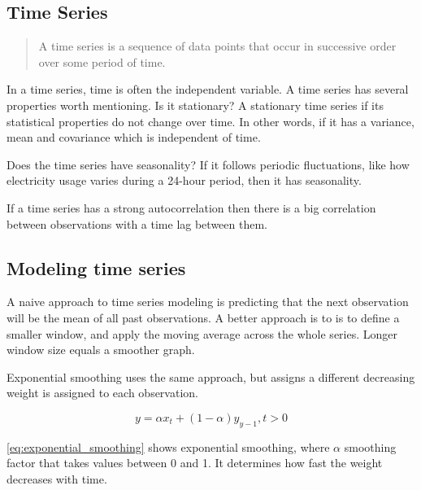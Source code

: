 \subsection{Time Series}
\label{sec:time-series}
\begin{quote}
    A time series is a sequence of data
    points that occur in successive order over some period of time.
\end{quote}
\cite{Hayes}

In a time series, time is often the independent variable.
A time series has several properties worth mentioning.
Is it stationary?
A stationary time series if its statistical properties do not change over time.
In other words, if it has a variance, mean and covariance which is independent of time.

Does the time series have seasonality?
If it follows periodic fluctuations, like how electricity usage varies during a 24-hour period,
then it has seasonality.

If a time series has a strong autocorrelation then there is a big
correlation between observations with a time lag between them.

\subsection{Modeling time series}
A naive approach to time series modeling is predicting that the next observation will be the
mean of all past observations. A better approach is to is to define a smaller window, and
apply the moving average across the whole series. Longer window size equals a smoother graph.

Exponential smoothing uses the same approach,
but assigns a different decreasing weight is assigned to each observation.

\begin{equation}
    \label{eq:exponential_smoothing}
    y = \alpha x_t + (1 - \alpha)y_{y-1}, t > 0
\end{equation}

\autoref{eq:exponential_smoothing}
shows exponential smoothing, where $\alpha$ smoothing factor
that takes values between 0 and 1. It determines how fast the weight decreases with time.





